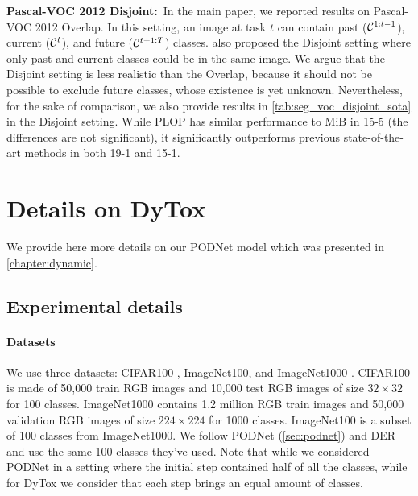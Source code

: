 

\noindent\textbf{Pascal-VOC 2012 Disjoint:\,} In the main paper, we reported results on Pascal-VOC
2012 Overlap. In this setting, an image at task $t$ can contain past ($\mathcal{C}^{1:t-1}$), current
($\mathcal{C}^t$), and future ($\mathcal{C}^{t+1:T}$) classes. \citet{cermelli2020modelingthebackground} also
proposed the Disjoint setting where only past and current classes could be in the same image. We
argue that the Disjoint setting is less realistic than the Overlap, because it should not be
possible to exclude future classes, whose existence is yet unknown. Nevertheless, for the sake of
comparison, we also provide results in \autoref{tab:seg_voc_disjoint_sota} in the Disjoint setting.
While PLOP has similar performance to MiB in 15-5 (the differences are not significant), it
significantly outperforms previous state-of-the-art methods in both 19-1 and 15-1.



\section{Details on DyTox}
\label{sec:appendix_dytox}

We provide here more details on our PODNet model which was presented in \autoref{chapter:dynamic}.

%


\subsection{Experimental details}

\paragraph{Datasets} We use three datasets: CIFAR100 \citep{krizhevskycifar100}, ImageNet100, and
ImageNet1000 \citep{deng2009imagenet}. CIFAR100 is made of 50,000 train RGB images and 10,000 test
RGB images of size $32\times32$ for 100 classes. ImageNet1000 contains 1.2 million RGB train images
and 50,000 validation RGB images of size $224\times224$ for 1000 classes. ImageNet100 is a subset of
100 classes from ImageNet1000. We follow PODNet (\autoref{sec:podnet}) and DER \citep{yan2021der}
and use the same 100 classes they've used. Note that while we considered PODNet in a setting where
the initial step contained half of all the classes, while for DyTox we consider that each step
brings an equal amount of classes.

